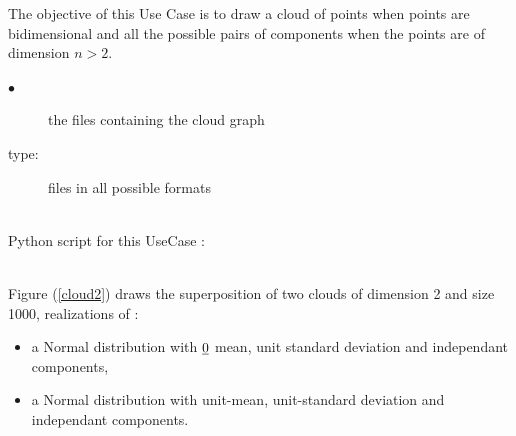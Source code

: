 \renewcommand{\filename}{docUC_InputWithData_CloudDrawing.tex}
\renewcommand{\filetitle}{UC :  Draw of clouds}

\HeaderIIILevel






The objective of this Use Case is to draw a cloud of points when points are bidimensional and all the possible pairs of components when the points are of dimension $n>2$.


             {
               \begin{description}
               \item[$\bullet$] the files containing the cloud graph
               \item[type:] files in all possible formats
               \end{description}
             }

             \textspace\\
             Python script for this UseCase :


             \textspace\\



             Figure (\ref{cloud2}) draws the superposition of two clouds of dimension 2 and size 1000, realizations of :
             \begin{itemize}
             \item a Normal distribution with ${\underline{0}}$ mean, unit standard deviation and independant components,
             \item a Normal distribution with unit-mean,  unit-standard deviation and independant components.
             \end{itemize}

